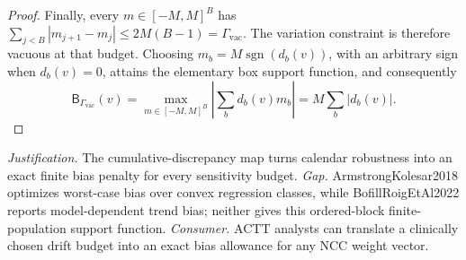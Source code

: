 \documentclass{article}
\begin{document}
\begin{proof}
Finally, every \(m\in[-M,M]^B\) has
\(\sum_{j<B}|m_{j+1}-m_j|\le2M(B-1)=\Gamma_{\mathrm{vac}}\).  The variation constraint is therefore vacuous at that budget.  Choosing \(m_b=M\operatorname{sgn}(d_b(v))\), with an arbitrary sign when \(d_b(v)=0\), attains the elementary box support function, and consequently
\[
\mathsf B_{\Gamma_{\mathrm{vac}}}(v)
=\max_{m\in[-M,M]^B}\left|\sum_bd_b(v)m_b\right|
=M\sum_b|d_b(v)|.
\]
\end{proof}
\par\smallskip\noindent \textit{Justification.} The cumulative-discrepancy map turns calendar robustness into an exact finite bias penalty for every sensitivity budget. \textit{Gap.} ArmstrongKolesar2018 optimizes worst-case bias over convex regression classes, while BofillRoigEtAl2022 reports model-dependent trend bias; neither gives this ordered-block finite-population support function. \textit{Consumer.} ACTT analysts can translate a clinically chosen drift budget into an exact bias allowance for any NCC weight vector.
\end{document}
